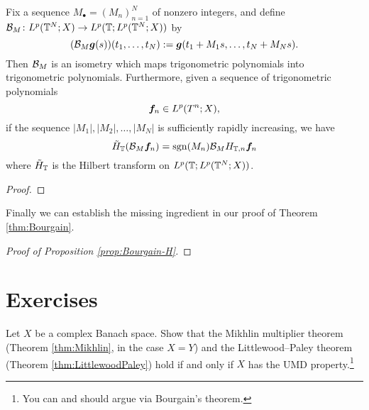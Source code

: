 \begin{lem}
  Fix a sequence $M_{\bullet} = (M_{n})_{n=1}^{N}$ of nonzero integers, and define $\mathcal{B}_{M} \colon L^p(\mathbb{T}^{N};X) \to L^{p}(\mathbb{T}; L^p(\mathbb{T}^{N};X))$ by
  \begin{equation*}
    (\mathcal{B}_{M} \bm{g}(s))(t_{1}, \ldots, t_{N}) := \bm{g}(t_{1} + M_{1} s, \ldots, t_{N} + M_{N} s).
  \end{equation*}
  Then $\mathcal{B}_{M}$ is an isometry which maps trigonometric polynomials into trigonometric polynomials.
  Furthermore, given a sequence of trigonometric polynomials
  \begin{equation*}
    \bm{f}_{n} \in L^p(T^{n};X),
  \end{equation*}
  if the sequence $|M_{1}|, |M_{2}|, \ldots, |M_{N}|$ is sufficiently rapidly increasing, we have
  \begin{equation*}
    \tilde{H}_{\mathbb{T}} (\mathcal{B}_{M} \bm{f}_{n}) = \operatorname{sgn}(M_{n}) \mathcal{B}_{M} H_{\mathbb{T},n} \bm{f}_{n}
  \end{equation*}
  where $\tilde{H}_{\mathbb{T}}$ is the Hilbert transform on $L^p(\mathbb{T}; L^p(\mathbb{T}^{N};X))$.
\end{lem}

\begin{proof}
  
\end{proof}

Finally we can establish the missing ingredient in our proof of Theorem \ref{thm:Bourgain}.

\begin{proof}[Proof of Proposition \ref{prop:Bourgain-H}]
  
\end{proof}






\section*{Exercises}

\begin{exercise}
  Let $X$ be a complex Banach space.
  Show that the Mikhlin multiplier theorem (Theorem \ref{thm:Mikhlin}, in the case $X = Y$) and the Littlewood--Paley theorem (Theorem \ref{thm:LittlewoodPaley}) hold if and only if $X$ has the UMD property.\footnote{You can and should argue via Bourgain's theorem.}
\end{exercise}




